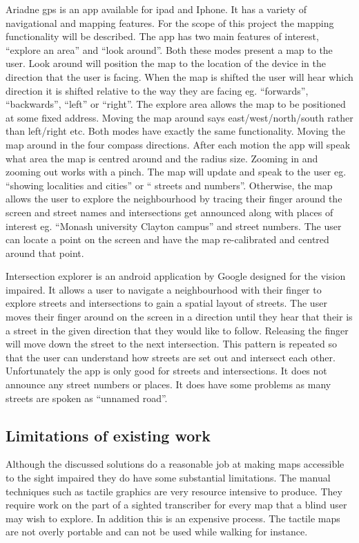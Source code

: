 \documentclass[11pt,twoside,a4paper]{article}
\begin{document}
Ariadne gps is an app available for ipad and Iphone. It has a variety of
navigational and mapping features. For the scope of this project the
mapping functionality will be described.
The app has two main features of interest, “explore an area” and “look
around”. Both these modes present a map to the user. Look around will
position the map to the location of the device in the direction that the
user is facing. When the map is shifted the user will hear which
direction it is shifted relative to the way they are facing
eg. ``forwards'', ``backwards'', ``left'' or ``right''. The explore area allows
the map to be positioned at some fixed address. Moving the map around
says east/west/north/south rather than left/right etc.
Both modes have exactly the same functionality. Moving the map around in
the four compass directions. After each motion the app will speak what
area the map is centred around and the radius size. Zooming in and
zooming out works with a pinch. The map will update and speak to the
user eg. “showing localities and cities” or “ streets and
numbers”. Otherwise, the map allows the user to explore the
neighbourhood by tracing their finger around the screen and street names
and intersections get announced along with places of interest
eg. “Monash university Clayton campus” and street numbers. The user can
locate a point on the screen and have the map re-calibrated and centred
around that point.

Intersection explorer is an android application by Google designed for
the vision impaired. It allows a user to navigate a neighbourhood with
their finger to explore streets and intersections to gain a spatial
layout of streets.
The user moves their finger around on the screen in a direction until
they hear that their is a street in the given direction that they would
like to follow. Releasing the finger will move down the street to the
next intersection. This pattern is repeated so that the user can
understand how streets are set out and intersect each
other. Unfortunately the app is only good for streets and
intersections. It does not announce any street numbers or places. It
does have some problems as many streets are spoken as “unnamed road”.

\subsection{Limitations of existing work}
Although the discussed solutions do a reasonable job at making maps
accessible to the sight impaired they do have some substantial
limitations. The manual techniques such as tactile graphics are very
resource intensive to produce. They require work on the part of a
sighted transcriber for every map that a blind user may wish to
explore. In addition this is an expensive process. The tactile maps are
not overly portable and can not be used while walking for instance.
\end{document}
